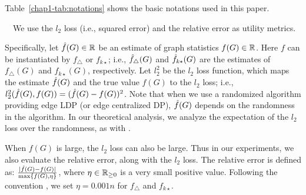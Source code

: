 Table~\ref{chap1-tab:notations} shows the basic notations used in this paper.

\smallskip
{}~~We use the $l_2$ loss (i.e., squared error) \cite{Kairouz_ICML16,Wang_USENIX17,Murakami_USENIX19} and the relative error \cite{Bindschaedler_SP16,Chen_CCS12,Xiao_SIGMOD11} as utility metrics. 

Specifically, let 
$\hat{f}(G) \in \mathbb{R}$ be an estimate of graph statistics $f(G) \in \mathbb{R}$. 
Here $f$ can be instantiated by 
$f_\triangle$ or $f_{k\star}$; 
i.e., 
$\hat{f}_\triangle(G)$ and $\hat{f}_{k\star}(G)$ are the estimates of $f_\triangle(G)$ and $f_{k\star}(G)$, respectively. 
Let $l_2^2$ be the $l_2$ loss function, which maps the estimate $\hat{f}(G)$ and the true value $f(G)$ to the $l_2$ loss; i.e., $l_2^2(\hat{f}(G), f(G)) = (\hat{f}(G) - f(G))^2$. 
% 
Note that when we use a randomized algorithm providing edge LDP (or edge centralized DP), $\hat{f}(G)$ depends on the randomness in the algorithm. 
In our theoretical analysis, we analyze the expectation of the $l_2$ loss over 
the randomness, as with \cite{Kairouz_ICML16,Wang_USENIX17,Murakami_USENIX19}. 

When $f(G)$ is large, the $l_2$ loss can also be large. 
Thus in our experiments, we also evaluate the relative error, along with the $l_2$ loss. 
The relative error is defined as: $\frac{|\hat{f}(G) - f(G)|}{\max\{f(G), \eta\}}$, where $\eta \in \mathbb{R}_{\ge0}$ is a very small positive value. 
Following the convention \cite{Bindschaedler_SP16,Chen_CCS12,Xiao_SIGMOD11}, we set $\eta = 0.001n$ 
for $f_\triangle$ and $f_{k\star}$. 
